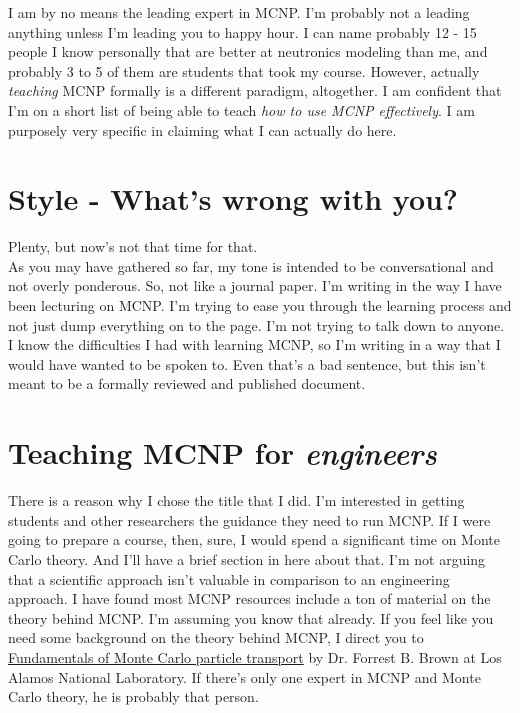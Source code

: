 \documentclass[11pt,a4paper]{article}
\begin{document}
\noindent I am by no means the leading expert in MCNP. I'm probably not a leading anything unless I'm leading you to happy hour. I can name probably 12 - 15 people I know personally that are better at neutronics modeling than me, and probably 3 to 5 of them are students that took my course. However, actually \textit{teaching} MCNP formally is a different paradigm, altogether. I am confident that I'm on a short list of being able to teach \textit{how to use MCNP effectively}. I am purposely very specific in claiming what I can actually do here.

\section{Style - What's wrong with you?}
\noindent Plenty, but now's not that time for that. \\

\noindent As you may have gathered so far, my tone is intended to be conversational and not overly ponderous. So, not like a journal paper. I'm writing in the way I have been lecturing on MCNP. I'm trying to ease you through the learning process and not just dump everything on to the page. I'm not trying to talk down to anyone. I know the difficulties I had with learning MCNP, so I'm writing in a way that I would have wanted to be spoken to. Even that's a bad sentence, but this isn't meant to be a formally reviewed and published document.\\

\newpage


\section{Teaching MCNP for \textit{engineers}}
\noindent There is a reason why I chose the title that I did. I'm interested in getting students and other researchers the guidance they need to run MCNP. If I were going to prepare a course, then, sure, I would spend a significant time on Monte Carlo theory. And I'll have a brief section in here about that. I'm not arguing that a scientific approach isn't valuable in comparison to an engineering approach. I have found most MCNP resources include a ton of material on the theory behind MCNP. I'm assuming you know that already. If you feel like you need some background on the theory behind MCNP, I direct you to \href{https://laws.lanl.gov/vhosts/mcnp.lanl.gov/pdf_files/la-ur-05-4983.pdf}{Fundamentals of Monte Carlo particle transport} by Dr. Forrest B. Brown at Los Alamos National Laboratory. If there's only one expert in MCNP and Monte Carlo theory, he is probably that person. 
\end{document}
